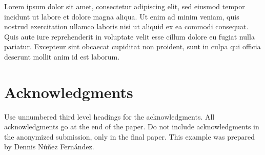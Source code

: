\documentclass{article}
\begin{document}
Lorem ipsum dolor sit amet, consectetur adipiscing elit, sed eiusmod tempor incidunt ut labore et dolore magna aliqua. Ut enim ad minim veniam, quis nostrud exercitation ullamco laboris nisi ut aliquid ex ea commodi consequat. Quis aute iure reprehenderit in voluptate velit esse cillum dolore eu fugiat nulla pariatur. Excepteur sint obcaecat cupiditat non proident, sunt in culpa qui officia deserunt mollit anim id est laborum.



\section{Acknowledgments}

Use unnumbered third level headings for the acknowledgments. All acknowledgments go at the end of the paper. Do not include acknowledgments in the anonymized submission, only in the final paper. This example was prepared by Dennis Núñez Fernández.



{}

\end{document}
